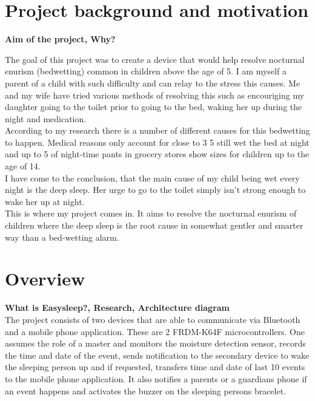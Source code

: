 \documentclass[12pt,a4paper]{article}
\begin{document}
	\section{Project background and motivation}
	{\bfseries Aim of the project, Why?}
	
	The goal of this project was to create a device that would help resolve nocturnal enurism (bedwetting) common in children above the age of 5. I am myself a parent of a child with  
	such difficulty and can relay to the stress this causes. Me and my wife have tried various  
	methods of resolving this such as encouriging my daughter going to the toilet prior to  
	going to the bed, waking her up during the night and medication.\\
	
	According to my research there is a number of different causes for this bedwetting to 
	happen. Medical reasons only account for close to 3%
	5 still wet the bed at night and up to 5%
	of night-time pants in grocery stores show sizes for children up to the age of 14.\\
	
	I have come to the conclusion, that the main cause of my child being wet every night is the 
	deep sleep. Her urge to go to the toilet simply isn't strong enough to wake her up at night.\\
	
	This is where my project comes in. It aims to resolve the nocturnal enurism of children 
	where the deep sleep is the root cause in somewhat gentler and smarter way than a bed-wetting
	alarm.
	\newpage
	
	\section{Overview}
	{\bfseries What is Easysleep?, Research, Architecture diagram}\\
	
	The project consists of two devices that are able to communicate via Bluetooth and a mobile phone application. These are 2 FRDM-K64F microcontrollers. One assumes the role of a master and 
	monitors the moisture detection sensor, records the time and date of the event, sends 
	notification to the secondary device to wake the sleeping person up and if requested, 
	transfers time and date of last 10 events to the mobile phone application. It also notifies a 
	parents or a guardians phone if an event happens and activates the buzzer on the sleeping 
	persons bracelet.\\
	
\end{document}
